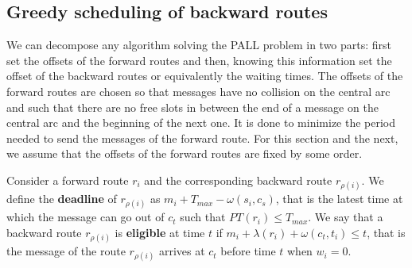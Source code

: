 \documentclass[10pt, conference, letterpaper]{IEEEtran}
\begin{document}
     
%	 
% 
%    
   \subsection{Greedy scheduling of backward routes}
    
    We can decompose any algorithm solving the PALL problem in two parts: first set the offsets of the forward routes and then, knowing this information set the offset of the backward routes or equivalently the waiting times.  
    The offsets of the forward routes are chosen so that messages have no collision on the central arc and such that there are no free slots in between the end of a message on the central arc and the beginning of the next one. 
    It is done to minimize the period needed to send the messages of the forward route. For this section and the next, we assume that the offsets of the forward routes are fixed by some order. 
    
    Consider a forward route $r_i$ and the corresponding backward route $r_{\rho(i)}$.
    We define the {\bf deadline} of $r_{\rho(i)}$ as $m_{i} + T_{max} - \omega(s_i,c_s)$, that is the latest time at which the message can go out of $c_t$ such that $PT(r_i) \leq T_{max}$.
    We say that a backward route $r_{\rho(i)}$ is {\bf eligible} at time $t$ if $m_{i} +  \lambda(r_i) + \omega(c_t,t_i) \leq t$, that is the message of the route $r_{\rho(i)}$ arrives at $c_t$ before time $t$ when $w_i = 0$.
    
\end{document}
